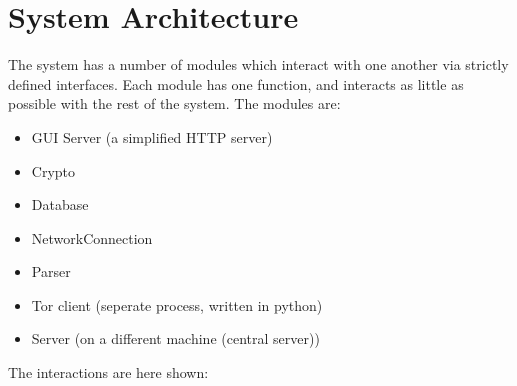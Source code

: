 \section{System Architecture}
The system has a number of modules which interact with one another via strictly
defined interfaces. Each module has one function, and interacts as little as
possible with the rest of the system. The modules are:
\begin{itemize}
    \item GUI Server (a simplified HTTP server)
    \item Crypto
    \item Database
    \item NetworkConnection
    \item Parser
    \item Tor client (seperate process, written in python)
    \item Server (on a different machine (central server))
\end{itemize}

The interactions are here shown:
